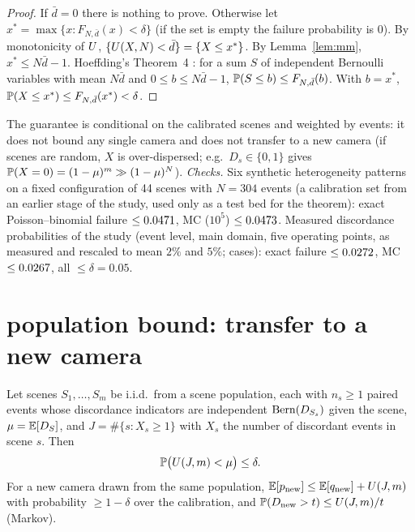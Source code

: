\begin{proof}
If $\bar d=0$ there is nothing to prove. Otherwise let $x^\ast=\max\{x:F_{N,\bar d}(x)<\delta\}$ (if the set is empty
the failure probability is $0$). By monotonicity of $U$, $\{U(X,N)<\bar d\}=\{X\le x^\ast\}$. By
Lemma~\ref{lem:mm}, $x^\ast\le N\bar d-1$. Hoeffding's Theorem~4 \cite{hoeffding1956}: for a sum $S$ of independent
Bernoulli variables with mean $N\bar d$ and $0\le b\le N\bar d-1$, $\mathbb{P}(S\le b)\le F_{N,\bar d}(b)$. With $b=x^\ast$,
$\mathbb{P}(X\le x^\ast)\le F_{N,\bar d}(x^\ast)<\delta$.
\end{proof}

\begin{remark}
The guarantee is conditional on the calibrated scenes and weighted by events: it does not bound any single camera
and does not transfer to a new camera (if scenes are random, $X$ is over-dispersed; e.g.\ $D_s\in\{0,1\}$ gives
$\mathbb{P}(X=0)=(1-\mu)^m\gg(1-\mu)^N$).
\emph{Checks.} Six synthetic heterogeneity patterns on a fixed configuration of 44 scenes with $N=304$ events (a
calibration set from an earlier stage of the study, used only as a test bed for the theorem): exact
Poisson--binomial failure $\le0.0471$, MC ($10^5$) $\le0.0473$. Measured discordance probabilities of
the study (event level, main domain, five operating points, as measured and rescaled to mean $2\%$ and $5\%$;
\numFleetMeasN{} cases): exact failure $\le0.0272$, MC $\le0.0267$, all $\le\delta=0.05$.
\end{remark}

\section{population bound: transfer to a new camera}

\begin{proposition}\label{prop:pop}
Let scenes $S_1,\dots,S_m$ be i.i.d.\ from a scene population, each with $n_s\ge1$ paired events whose
discordance indicators are independent $\mathrm{Bern}(D_{S_s})$ given the scene, $\mu=\mathbb{E}[D_S]$, and
$J=\#\{s:X_s\ge1\}$ with $X_s$ the number of discordant events in scene $s$. Then
\[\mathbb{P}\bigl(U(J,m)<\mu\bigr)\le\delta .\]
For a new camera drawn from the same population, $\mathbb{E}[p_{\mathrm{new}}]\le\mathbb{E}[q_{\mathrm{new}}]+U(J,m)$ with
probability $\ge1-\delta$ over the calibration, and $\mathbb{P}(D_{\mathrm{new}}>t)\le U(J,m)/t$ (Markov).
\end{proposition}

